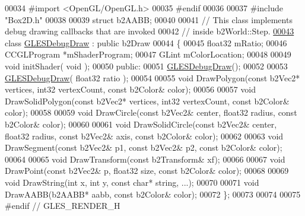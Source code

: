 \begin{DoxyCode}
00034 \textcolor{preprocessor}{}\textcolor{preprocessor}{#import <OpenGL/OpenGL.h>}
00035 \textcolor{preprocessor}{#endif}
00036 \textcolor{preprocessor}{}
00037 \textcolor{preprocessor}{#include "Box2D.h"}
00038 
00039 \textcolor{keyword}{struct }b2AABB;
00040 
00041 \textcolor{comment}{// This class implements debug drawing callbacks that are invoked}
00042 \textcolor{comment}{// inside b2World::Step.}
\hypertarget{_g_l_e_s-_render_8h_source_l00043}{}\hyperlink{class_g_l_e_s_debug_draw}{00043} \textcolor{keyword}{class }\hyperlink{class_g_l_e_s_debug_draw}{GLESDebugDraw} : \textcolor{keyword}{public} b2Draw
00044 \{
00045     float32 mRatio;
00046     CCGLProgram *mShaderProgram;
00047     GLint       mColorLocation;
00048 
00049     \textcolor{keywordtype}{void} initShader( \textcolor{keywordtype}{void} );
00050 \textcolor{keyword}{public}:
00051     \hyperlink{class_g_l_e_s_debug_draw}{GLESDebugDraw}();
00052 
00053     \hyperlink{class_g_l_e_s_debug_draw}{GLESDebugDraw}( float32 ratio );
00054 
00055     \textcolor{keywordtype}{void} DrawPolygon(\textcolor{keyword}{const} b2Vec2* vertices, int32 vertexCount, \textcolor{keyword}{const} b2Color& color);
00056 
00057     \textcolor{keywordtype}{void} DrawSolidPolygon(\textcolor{keyword}{const} b2Vec2* vertices, int32 vertexCount, \textcolor{keyword}{const} b2Color& color);
00058 
00059     \textcolor{keywordtype}{void} DrawCircle(\textcolor{keyword}{const} b2Vec2& center, float32 radius, \textcolor{keyword}{const} b2Color& color);
00060 
00061     \textcolor{keywordtype}{void} DrawSolidCircle(\textcolor{keyword}{const} b2Vec2& center, float32 radius, \textcolor{keyword}{const} b2Vec2& axis, \textcolor{keyword}{const} b2Color& color);
00062 
00063     \textcolor{keywordtype}{void} DrawSegment(\textcolor{keyword}{const} b2Vec2& p1, \textcolor{keyword}{const} b2Vec2& p2, \textcolor{keyword}{const} b2Color& color);
00064 
00065     \textcolor{keywordtype}{void} DrawTransform(\textcolor{keyword}{const} b2Transform& xf);
00066 
00067     \textcolor{keywordtype}{void} DrawPoint(\textcolor{keyword}{const} b2Vec2& p, float32 size, \textcolor{keyword}{const} b2Color& color);
00068 
00069     \textcolor{keywordtype}{void} DrawString(\textcolor{keywordtype}{int} x, \textcolor{keywordtype}{int} y, \textcolor{keyword}{const} \textcolor{keywordtype}{char}* \textcolor{keywordtype}{string}, ...);
00070 
00071     \textcolor{keywordtype}{void} DrawAABB(b2AABB* aabb, \textcolor{keyword}{const} b2Color& color);
00072 \};
00073 
00074 
00075 \textcolor{preprocessor}{#endif // GLES\_RENDER\_H}
\end{DoxyCode}
